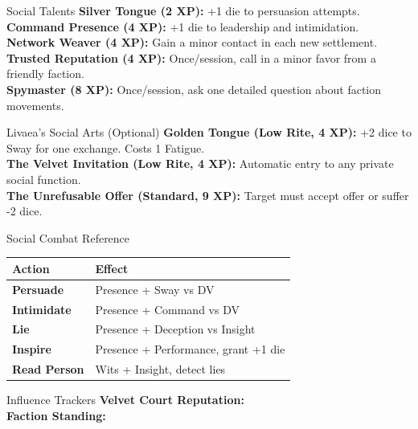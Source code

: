 \documentclass[10pt]{article}
\begin{document}
\begin{minipage}[t]{0.48\linewidth}
    \vspace{0.5em}
    
    \begin{charbox}{Social Talents}
        \textbf{Silver Tongue (2 XP):} +1 die to persuasion attempts.\\
        \textbf{Command Presence (4 XP):} +1 die to leadership and intimidation.\\
        \textbf{Network Weaver (4 XP):} Gain a minor contact in each new settlement.\\
        \textbf{Trusted Reputation (4 XP):} Once/session, call in a minor favor from a friendly faction.\\
        \textbf{Spymaster (8 XP):} Once/session, ask one detailed question about faction movements.
    \end{charbox}
\end{minipage}
\hfill
\begin{minipage}[t]{0.48\linewidth}
    \begin{charbox}{Livaea's Social Arts (Optional)}
        \textbf{Golden Tongue (Low Rite, 4 XP):} +2 dice to Sway for one exchange. Costs 1 Fatigue.\\
        \textbf{The Velvet Invitation (Low Rite, 4 XP):} Automatic entry to any private social function.\\
        \textbf{The Unrefusable Offer (Standard, 9 XP):} Target must accept offer or suffer -2 dice.
    \end{charbox}
    
    \vspace{0.5em}
    
    \begin{charbox}{Social Combat Reference}
        \begin{tabular}{>{\bfseries}p{3cm} p{4.5cm}}
            \toprule
            \textbf{Action} & \textbf{Effect} \\
            \midrule
            Persuade & Presence + Sway vs DV \\
            Intimidate & Presence + Command vs DV \\
            Lie & Presence + Deception vs Insight \\
            Inspire & Presence + Performance, grant +1 die \\
            Read Person & Wits + Insight, detect lies \\
            \bottomrule
        \end{tabular}
    \end{charbox}
    
    \vspace{0.5em}
    
    \begin{charbox}{Influence Trackers}
        \textbf{Velvet Court Reputation:} \underline{\hspace{5cm}}\\
        \textbf{Faction Standing:} \underline{\hspace{5cm}}
    \end{charbox}
\end{minipage}
\end{document}
